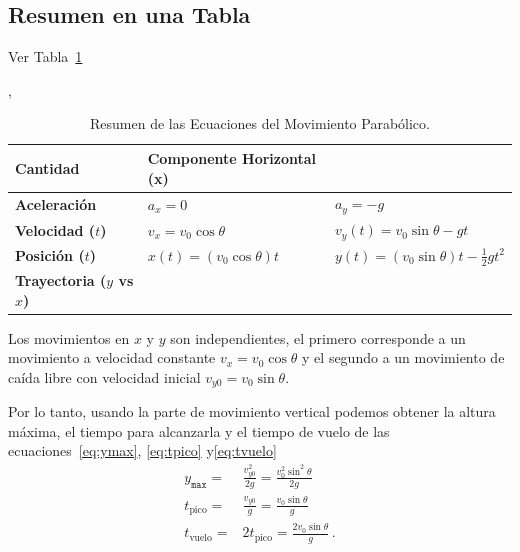 \documentclass[11pt,a4paper]{book}
\renewcommand{\arraystretch}{1.9}
\begin{document}
\subsection*{Resumen en una Tabla}
Ver Tabla~\ref{tab:parabolic_equations} 

\begin{table}[h!]
\centering,
\caption{Resumen de las Ecuaciones del Movimiento Parabólico.}
\label{tab:parabolic_equations}
\renewcommand{\arraystretch}{1.5} %
\begin{tabular}{| >{\centering\arraybackslash}m{2.5cm} | >{\centering\arraybackslash}m{5cm} | >{\centering\arraybackslash}m{5cm} |}
\hline
\textbf{Cantidad} & \textbf{Componente Horizontal (x)} & \textbf{Componente Vertical (\subsection*{Resumen en una Tabla}
y)} \\
\hline \hline
\textbf{Aceleración} & $a_x = 0$ & $a_y = -g$ \\
\hline
\textbf{Velocidad ($t$)} & $v_x = v_0 \cos\theta$ & $v_y(t) = v_0 \sin\theta - gt$ \\
\hline
\textbf{Posición ($t$)} & $x(t) = (v_0 \cos\theta) t$ & $y(t) = (v_0 \sin\theta) t - \frac{1}{2}gt^2$ \\
\hline
\textbf{Trayectoria ($y$ vs $x$)} & \multicolumn{2}{c|}{$y(x) = x\tan\theta - \left(\frac{g}{2v_0^2\cos^2\theta}\right)x^2$} \\
\hline
\end{tabular}
\end{table}

Los movimientos en $x$ y $y$ son independientes, el primero corresponde a un movimiento a velocidad constante $v_x=v_0\cos\theta$ y el segundo a un movimiento de caída libre con velocidad inicial $v_{y0}=v_0\sin\theta$.

Por lo tanto, usando la parte de movimiento vertical podemos obtener la altura máxima, el tiempo para alcanzarla y el tiempo de vuelo de las ecuaciones~\eqref{eq:ymax}, \eqref{eq:tpico} y\eqref{eq:tvuelo}
\begin{align}
    y_{\texttt{max}} =& \frac{v_{y0}^2}{2g}=\frac{v_0^2\sin^2\theta}{2g}\\
    t_{\text{pico}} =&\frac{v_{y0}}{g} = \frac{v_0\sin\theta}{g}\\
    t_{\text{vuelo}} =& 2t_{\text{pico}}=\frac{2v_0\sin\theta}{g}\,.
\end{align}
\end{document}
